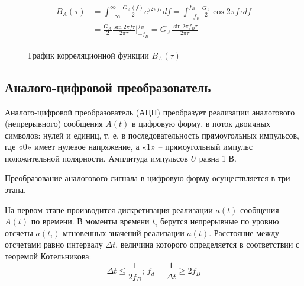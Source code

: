 \documentclass[a4paper, 12pt]{article}
\newcommand{\graxisX}{
  \draw[ultra thin, gray] (axis cs:\pgfkeysvalueof{/pgfplots/xmin},0) -- (axis cs:\pgfkeysvalueof{/pgfplots/xmax},0)
}
\begin{document}
\begin{enumerate}
  \begin{align}\begin{split}
    B_A(\tau)&=\int^\infty_{-\infty}\frac{G_A(f)}{2}e^{j2\pi f\tau}df
    =\int^{f_B}_{-f_B}\frac{G_A}{2}\cos{2\pi f\tau}df\\
    &=\frac{G_A}2 \frac{\sin{2\pi f \tau}}{2\pi \tau}\Biggr|^{f_B}_{-f_B} 
    =G_A\frac{\sin{2\pi f_B \tau}}{2\pi\tau}
  \end{split}\end{align}

  \begin{figure}[H]
    \centering
    \caption{График корреляционной функции $B_A(\tau)$}
    \label{fig:coorel_plot}
  \end{figure}
\end{enumerate}

\subsection{Аналого-цифровой преобразователь}
Аналого-цифровой преобразователь (АЦП) преобразует реализации 
аналогового (непрерывного) сообщения $A(t)$ в цифровую 
форму, в поток двоичных символов: нулей и единиц, 
т. е. в последовательность прямоугольных импульсов, 
где «0» имеет нулевое напряжение, а «1» -- прямоугольный 
импульс положительной полярности. 
Амплитуда импульсов $U$ равна 1 В.

Преобразование аналогового сигнала в цифровую форму 
осуществляется в три этапа.

На первом этапе производится дискретизация реализации 
$a(t)$ сообщения $A(t)$ по времени. В моменты времени $t_i$ 
берутся непрерывные по уровню отсчеты $a(t_i)$ 
мгновенных значений реализации $a(t)$. Расстояние
между отсчетами равно интервалу $\Delta t$, величина которого
определяется в соответствии с теоремой Котельникова:
\begin{equation}
  \Delta t \leq \frac{1}{2f_B};\, 
  f_d=\frac{1}{\Delta t}\geq2f_B
\end{equation}
\end{document}
